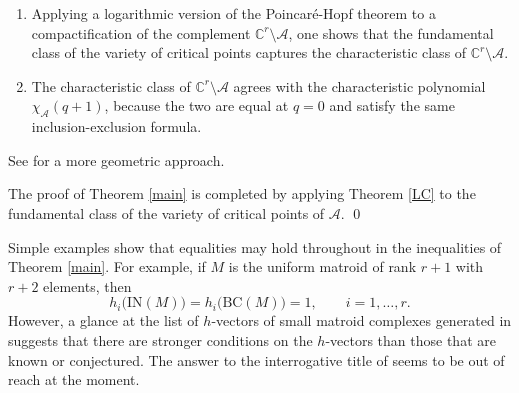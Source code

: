 \documentclass{compositio}
\theoremstyle{definition}
\theoremstyle{remark}
\begin{document}
\begin{enumerate}[1.]
\item Applying a logarithmic version of the Poincar\'e-Hopf theorem to a compactification of the complement $\mathbb{C}^r \setminus \mathcal{A}$, one shows that the fundamental class of the variety of critical points captures the characteristic class of $\mathbb{C}^r \setminus \mathcal{A}$.
\item The characteristic class of $\mathbb{C}^r \setminus \mathcal{A}$ agrees with the characteristic polynomial $\chi_\mathcal{A}(q+1)$, because the two are equal at $q=0$ and satisfy the same inclusion-exclusion formula.
\end{enumerate}
See \cite[Section 3]{Denham-Garrousian-Schulze} for a more geometric approach. 

The proof of Theorem \ref{main} is completed by applying Theorem \ref{LC} to the fundamental class of the variety of critical points of $\mathcal{A}$.
\qed


Simple examples show that equalities may hold throughout in the inequalities of Theorem \ref{main}. For example, if $M$ is the uniform matroid of rank $r+1$ with $r+2$ elements, then
\[
h_i\big(\text{IN}(M)\big) = h_i\big(\text{BC}(M)\big)  =1, \qquad i=1,\ldots,r.
\]
However, a glance at the list of $h$-vectors of small matroid complexes generated in \cite{DeLoera-Kemper-Klee} suggests that there are stronger conditions on the $h$-vectors
than those that are known or conjectured. The answer to the interrogative title of \cite{Wilf} seems to be out of reach at the moment.
\end{document}
